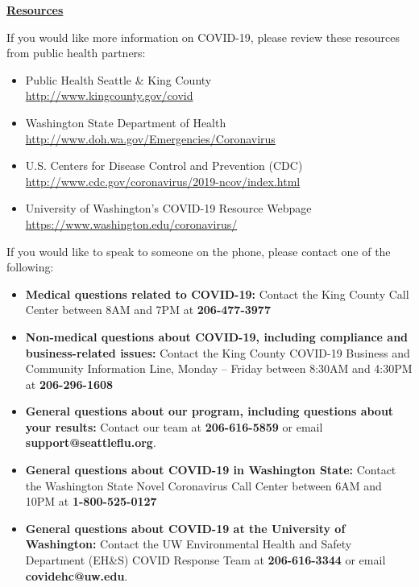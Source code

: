\documentclass[10pt]{article}
\begin{document}
\bigskip

\large \underline{\textbf{Resources}}

If you would like more information on COVID-19, please review these resources
from public health partners:

\begin{itemize}
\item
  Public Health \textemdash Seattle \& King County\\
  \url{http://www.kingcounty.gov/covid}

\item

  Washington State Department of Health\\
  \url{http://www.doh.wa.gov/Emergencies/Coronavirus}

\item
  U.S. Centers for Disease Control and Prevention (CDC)\\
  \url{http://www.cdc.gov/coronavirus/2019-ncov/index.html}

\item
  University of Washington’s COVID-19 Resource Webpage\\
  \url{https://www.washington.edu/coronavirus/}

\end{itemize}

If you would like to speak to someone on the phone, please contact one of the
following:

\begin{itemize}

\item

  \textbf{Medical questions related to COVID-19:} Contact the King County Call
  Center between 8AM and 7PM at \textbf{206-477-3977}

\item

  \textbf{Non-medical questions about COVID-19, including compliance and
  business-related issues:} Contact the King County COVID-19 Business and
  Community Information Line, Monday – Friday between 8:30AM and 4:30PM at
  \textbf{206-296-1608}

\item
  \textbf{General questions about our program, including questions about your
  results:} Contact our team at \textbf{206-616-5859} or email
  \textbf{support@seattleflu.org}.

\item

  \textbf{General questions about COVID-19 in Washington State:} Contact the
  Washington State Novel Coronavirus Call Center between 6AM and 10PM at
  \textbf{1-800-525-0127}

\item
  \textbf{General questions about COVID-19 at the University of Washington:}
  Contact the UW Environmental Health and Safety Department (EH\&S) COVID
  Response Team at \textbf{206-616-3344} or email \textbf{covidehc@uw.edu}.

\end{itemize}
\end{document}
